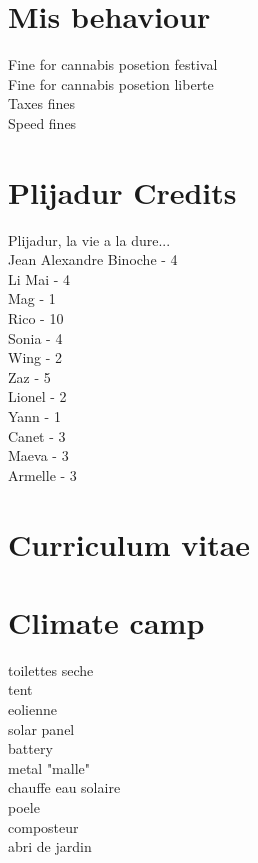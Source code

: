 \documentclass[8pt]{article} %
\begin{document}
\section{Mis behaviour}
Fine for cannabis posetion festival			\\
Fine for cannabis posetion liberte			\\
Taxes fines			\\
Speed fines			\\
 
\section{Plijadur Credits}

Plijadur, la vie a la dure... \\
Jean Alexandre Binoche - 4\\
Li Mai - 4\\
Mag - 1			\\
Rico - 10			\\
Sonia	- 4		\\
Wing	- 2		\\
Zaz	- 5		\\
Lionel - 2			\\
Yann	- 1		\\
Canet	- 3		\\
Maeva	- 3		\\
Armelle	- 3		\\

\section{Curriculum vitae}

\section{Climate camp}
toilettes seche			\\
tent			\\
eolienne			\\
solar panel			\\
battery			\\
metal "malle"			\\
chauffe eau solaire			\\
poele			\\
composteur			\\
abri de jardin			\\
			
\end{document}
